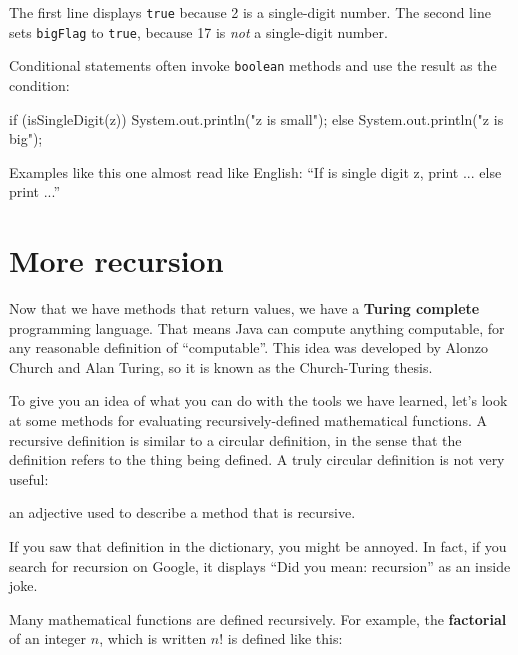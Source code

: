 \documentclass[12pt]{book}
\newcommand{\term}[1]{%
\index{#1}
\item[#1:]}
\theoremstyle{exercise}
\newcommand{\java}[1]{\verb"#1"}
\begin{document}
The first line displays \java{true} because 2 is a single-digit number.
The second line sets \java{bigFlag} to \java{true}, because 17 is {\em not} a single-digit number.

Conditional statements often invoke \java{boolean} methods and use the result as the condition:

\begin{code}
    if (isSingleDigit(z)) {
        System.out.println("z is small");
    } else {
        System.out.println("z is big");
    }
\end{code}

Examples like this one almost read like English: ``If is single digit z, print ... else print ...''


\section{More recursion}
\label{factorial}



Now that we have methods that return values, we have a {\bf Turing complete} programming language.
That means Java can compute anything computable, for any reasonable definition of ``computable''.
This idea was developed by Alonzo Church and Alan Turing, so it is known as the Church-Turing thesis.

To give you an idea of what you can do with the tools we have learned, let's look at some methods for evaluating recursively-defined mathematical functions.
A recursive definition is similar to a circular definition, in the sense that the definition refers to the thing being defined.
A truly circular definition is not very useful:

\begin{description}
\term{recursive} an adjective used to describe a method that is recursive.
\end{description}

If you saw that definition in the dictionary, you might be annoyed.
In fact, if you search for recursion on Google, it displays ``Did you mean: recursion'' as an inside joke.


Many mathematical functions are defined recursively.
For example, the {\bf factorial} of an integer $n$, which is written $n!$ is defined like this:
\end{document}
